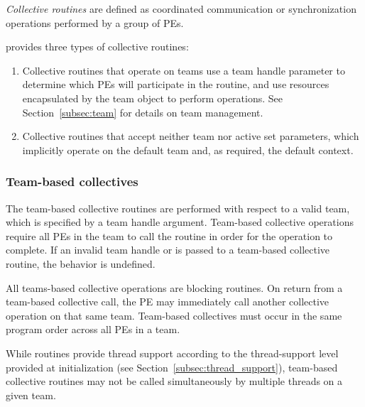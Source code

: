 \emph{Collective routines} are defined as coordinated communication or synchronization
operations performed by a group of \acp{PE}.

\openshmem provides three types of collective routines:

\begin{enumerate}
\item Collective routines that operate on teams use a team handle parameter to determine
  which \acp{PE} will participate in the routine, and use resources encapsulated by the team object
  to perform operations. See Section~\ref{subsec:team} for details on team management.


\item Collective routines that accept neither team nor active set
  parameters, which implicitly operate on the default team and, as
  required, the default context.
\end{enumerate}

\subsubsection*{Team-based collectives}

The team-based collective routines are performed with respect to a valid
\openshmem team, which is specified by a team handle argument.
Team-based collective operations require all \acp{PE} in the team to call
the routine in order for the operation to complete. If an invalid team handle
or  is passed to a team-based collective
routine, the behavior is undefined.

All \openshmem teams-based collective operations are blocking routines.  On
return from a team-based collective call, the \ac{PE} may immediately call
another collective operation on that same team.
Team-based collectives must occur in the same
program order across all \acp{PE} in a team.

While \openshmem routines provide thread support according to the
thread-support level provided at initialization (see
Section~\ref{subsec:thread_support}), team-based collective routines
may not be called simultaneously by multiple threads on a given team.

